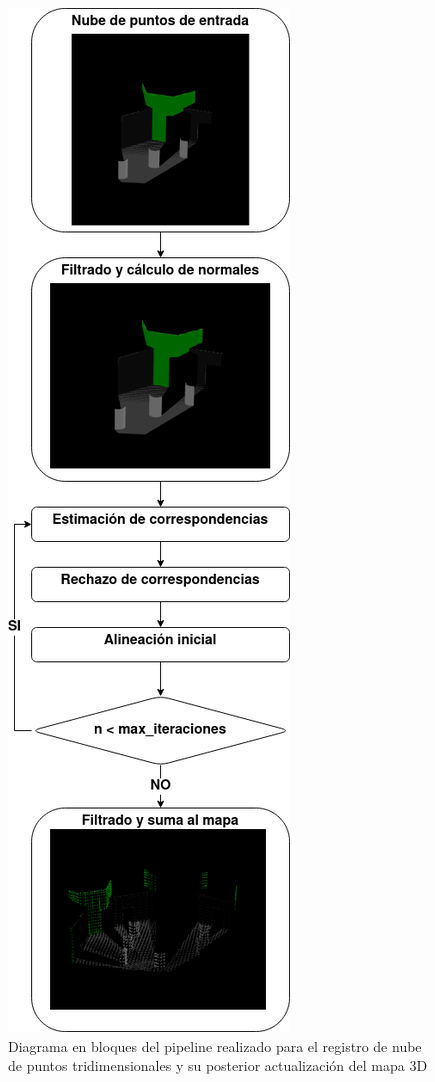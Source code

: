 \begin{figure}
    \centering
    \includegraphics[scale=0.45]{Img/3DAlgorithmBlockDiagram.png}
    \caption{Diagrama en bloques del pipeline realizado para el registro de nube de puntos tridimensionales y su posterior actualización del mapa 3D}
    \label{fig:3dalgorithmblockdiagram}
\end{figure}

